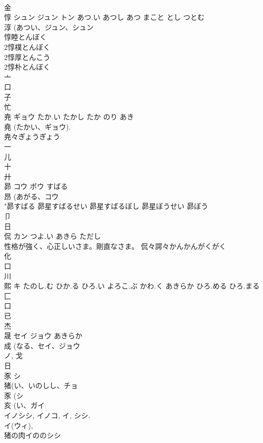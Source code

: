 \documentclass[8pt]{extreport}
\begin{document}
\begin{CJK}{UTF8}{min}
\\	金 
\\	惇	シュン ジュン トン	あつ.い あつし あつ まこと とし つとむ	
\\	淳 (あつい、ジュン、シュン 
\\	惇睦とんぼく
\\	2惇樸とんぼく
\\	2惇厚とんこう
\\	2惇朴とんぼく
\\	亠 
\\	口 
\\	子 
\\	忙 
\\	尭	ギョウ	たか.い たかし たか のり あき	
\\	堯 (たかい、ギョウ). 
\\	尭々ぎょうぎょう
\\	一 
\\	儿 
\\	十 
\\	廾 
\\	昴	コウ ボウ	すばる	
\\	昂 (あがる、コウ 
\\	"昴すばる 昴星すばるせい 昴星すばるぼし 昴星ぼうせい 昴ぼう 
\\	卩 
\\	日 
\\	侃	カン	つよ.い あきら ただし	
\\	性格が強く、心正しいさま。剛直なさま。		侃々諤々かんかんがくがく
\\	化 
\\	口 
\\	川 
\\	熙	キ	たのし.む ひか.る ひろ.い よろこ.ぶ かわ.く あきらか ひろ.める ひろ.まる	
\\	匚 
\\	口 
\\	已 
\\	杰	
\\	晟	セイ ジョウ	あきらか	
\\	成 (なる、セイ、ジョウ 
\\	ノ, 戈 
\\	日 
\\	豕	シ		
\\	猪(い、いのしし、チョ 
\\	豕 (シ 
\\	亥 (い、ガイ 
\\	イノシシ, イノコ, イ, シシ. 
\\	イ(ウィ), 
\\	猪の肉イののシシ 

\end{CJK}
\end{document}
